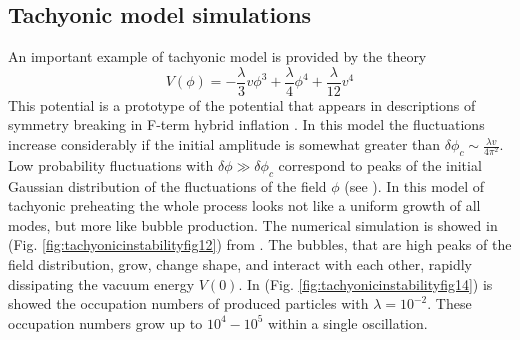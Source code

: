 \documentclass[11pt,a4paper,twoside]{book}
\begin{document}
\subsection{Tachyonic model simulations}
An important example of tachyonic model is provided by the theory
\begin{equation}
	\label{Chap5:TachyonicModel1}
V(\phi)=-\frac{\lambda}{3}v\phi^{3} + \frac{\lambda}{4}\phi^{4} + \frac{\lambda}{12}v^{4}
\end{equation}
This potential is a prototype of the potential that appears in descriptions of symmetry breaking in F-term hybrid inflation \cite{Chap5:FTerm}. In this model the fluctuations increase considerably if the initial amplitude is somewhat greater than $ \delta \phi_{c} \sim \frac{\lambda v}{4\pi^{2}} $. Low probability fluctuations with $ \delta \phi \gg \delta \phi_{c} $ correspond to peaks of the initial Gaussian distribution of the fluctuations  of the field $\phi$ (see \cite{Chap5:TachyonicInstability}). In this model of tachyonic preheating the whole process looks not like a uniform growth of all modes, but more like bubble  production. The numerical simulation is showed in (Fig. \ref{fig:tachyonicinstabilityfig12}) from \cite{Chap5:TachyonicInstability}. The bubbles, that are high peaks of the field distribution, grow, change shape, and interact with each other, rapidly dissipating the vacuum energy $ V(0) $. In (Fig. \ref{fig:tachyonicinstabilityfig14}) is showed the occupation numbers of produced particles with $ \lambda=10^{-2} $. These occupation numbers grow up to $ 10^{4}-10^{5} $ within a single oscillation.\\
\\
\end{document}
